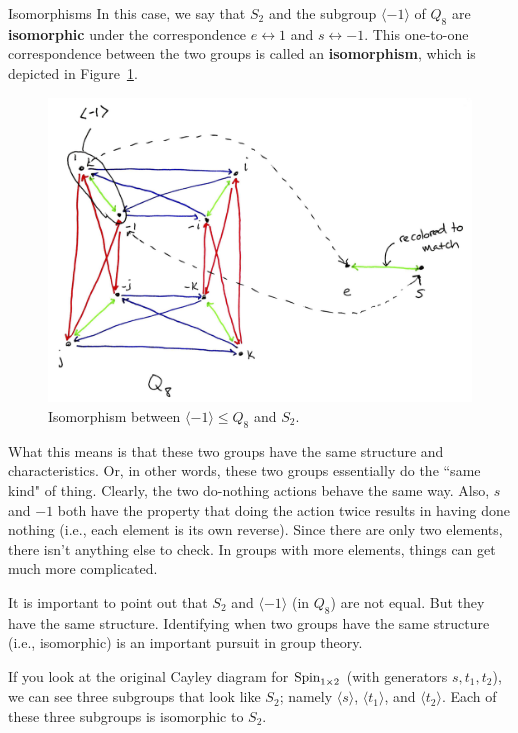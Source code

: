 \begin{section}{Isomorphisms}
In this case, we say that $S_2$ and the subgroup $\langle -1\rangle$ of $Q_8$ are \textbf{isomorphic} under the correspondence $e\leftrightarrow 1$ and $s\leftrightarrow -1$.  This one-to-one correspondence between the two groups is called an \textbf{isomorphism}, which is depicted in Figure~\ref{fig:isoS2}.
  
\begin{figure}
\centering
\includegraphics[width=5in]{isoS2.png}
\caption{Isomorphism between $\langle -1\rangle\leq Q_8$ and $S_2$.}\label{fig:isoS2}
\end{figure}

What this means is that these two groups have the same structure and characteristics.  Or, in other words, these two groups essentially do the ``same kind" of thing.  Clearly, the two do-nothing actions behave the same way.  Also, $s$ and $-1$ both have the property that doing the action twice results in having done nothing (i.e., each element is its own reverse).  Since there are only two elements, there isn't anything else to check.  In groups with more elements, things can get much more complicated.  

It is important to point out that $S_2$ and $\langle -1\rangle$ (in $Q_8$) are not equal.  But they have the same structure.  Identifying when two groups have the same structure (i.e., isomorphic) is an important pursuit in group theory.

If you look at the original Cayley diagram for $\operatorname{Spin}_{1\times 2}$ (with generators $s, t_1, t_2$), we can see three subgroups that look like $S_2$; namely $\langle s\rangle$, $\langle t_1\rangle$, and $\langle t_2\rangle$.  Each of these three subgroups is isomorphic to $S_2$.  


\end{section}
